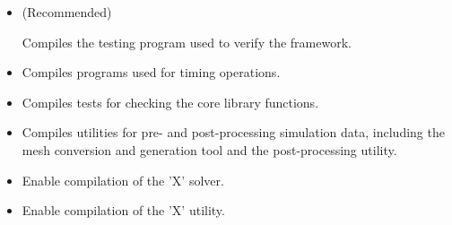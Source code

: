 \begin{itemize}
    \item {} (Recommended)

    Compiles the testing program used to verify the \nekpp framework.

    \item {}

    Compiles programs used for timing \nekpp operations.

    \item {}

    Compiles tests for checking the core library functions.

    \item {}

    Compiles utilities for pre- and post-processing simulation data, including the mesh conversion and generation tool  and the  post-processing utility.

    \item {}

    Enable compilation of the 'X' solver.

    \item {}

    Enable compilation of the 'X' utility.
\end{itemize}

